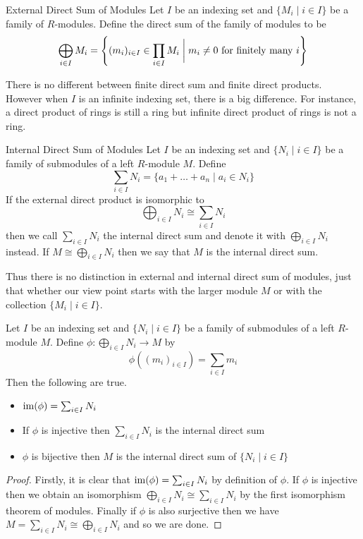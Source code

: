 \documentclass[a4paper]{article}
\begin{document}
\begin{defn}{External Direct Sum of Modules}{} Let $I$ be an indexing set and $\{M_i\;|\;i\in I\}$ be a family of $R$-modules. Define the direct sum of the family of modules to be $$\bigoplus_{i\in I}M_i=\left\{(m_i)_{i\in I}\in\prod_{i\in I}M_i\;\bigg{|}\;m_i\neq 0\text{ for finitely many }i\right\}$$
\end{defn}

There is no different between finite direct sum and finite direct products. However when $I$ is an infinite indexing set, there is a big difference. For instance, a direct product of rings is still a ring but infinite direct product of rings is not a ring. 

\begin{defn}{Internal Direct Sum of Modules}{} Let $I$ be an indexing set and $\{N_i\;|\;i\in I\}$ be a family of submodules of a left $R$-module $M$. Define $$\sum_{i\in I}N_i=\{a_1+\dots+a_n\;|\;a_i\in N_i\}$$ If the external direct product is isomorphic to $$\bigoplus_{i\in I}N_i\cong\sum_{i\in I}N_i$$ then we call $\sum_{i\in I}N_i$ the internal direct sum and denote it with $\bigoplus_{i\in I}N_i$ instead. If $M\cong\bigoplus_{i\in I}N_i$ then we say that $M$ is the internal direct sum. 
\end{defn}

Thus there is no distinction in external and internal direct sum of modules, just that whether our view point starts with the larger module $M$ or with the collection $\{M_i\;|\;i\in I\}$. 

\begin{lmm}{}{} Let $I$ be an indexing set and $\{N_i\;|\;i\in I\}$ be a family of submodules of a left $R$-module $M$. Define $\phi:\bigoplus_{i\in I}N_i\to M$ by $$\phi\left((m_i)_{i\in I}\right)=\sum_{i\in I}m_i$$ Then the following are true. 
\begin{itemize}
\item $\operatorname{im}(\phi)=\sum_{i\in I}N_i$
\item If $\phi$ is injective then $\sum_{i\in I}N_i$ is the internal direct sum
\item $\phi$ is bijective then $M$ is the internal direct sum of $\{N_i\;|\;i\in I\}$
\end{itemize} \tcbline
\begin{proof}
Firstly, it is clear that $\operatorname{im}(\phi)=\sum_{i\in I}N_i$ by definition of $\phi$. If $\phi$ is injective then we obtain an isomorphism $\bigoplus_{i\in I}N_i\cong\sum_{i\in I}N_i$ by the first isomorphism theorem of modules. Finally if $\phi$ is also surjective then we have $M=\sum_{i\in I}N_i\cong\bigoplus_{i\in I}N_i$ and so we are done. 
\end{proof}
\end{lmm}
\end{document}
